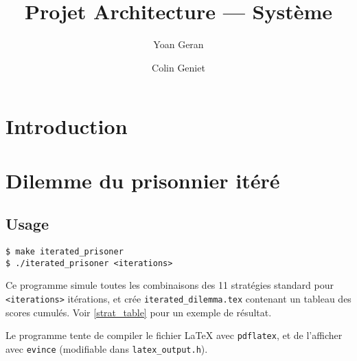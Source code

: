 \documentclass[10pt]{article}
\title{Projet Architecture --- Système}
\author{Yoan Geran \and Colin Geniet}
\begin{document}
\maketitle
\tableofcontents

\section*{Introduction}

\section{Dilemme du prisonnier itéré}
\subsection{Usage}
\begin{verbatim}
$ make iterated_prisoner
$ ./iterated_prisoner <iterations>
\end{verbatim}

Ce programme simule toutes les combinaisons des 11 stratégies standard pour \verb|<iterations>| itérations,
et crée \verb|iterated_dilemma.tex| contenant un tableau des scores cumulés.
Voir \ref{strat_table} pour un exemple de résultat.

Le programme tente de compiler le fichier \LaTeX{} avec \verb|pdflatex|, et de l'afficher avec \verb|evince|
(modifiable dans \verb|latex_output.h|).
\end{document}
